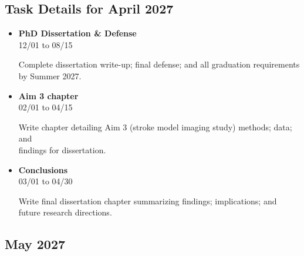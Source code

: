 \documentclass[landscape,a4paper]{article}
\begin{document}
\vspace{0.5cm}
\subsection{Task Details for April 2027}
\begin{itemize}[leftmargin=1cm, itemsep=0.8em]
    \item \textcolor{other}{\textbf{PhD Dissertation \& Defense}}\\[0.2em]
          \textcolor{black!70}{\small 12/01 to 08/15}
\\[0.3em]
          \begin{minipage}[t]{0.85\textwidth}
          \textcolor{black!80}{Complete dissertation write-up; final defense; and all graduation requirements by Summer 2027.}
          \end{minipage}

    \item \textcolor{other}{\textbf{Aim 3 chapter}}\\[0.2em]
          \textcolor{black!70}{\small 02/01 to 04/15}
\\[0.3em]
          \begin{minipage}[t]{0.85\textwidth}
          \textcolor{black!80}{Write chapter detailing Aim 3 (stroke model imaging study) methods; data; and\\[0.1em]
          findings for dissertation.}
          \end{minipage}

    \item \textcolor{other}{\textbf{Conclusions}}\\[0.2em]
          \textcolor{black!70}{\small 03/01 to 04/30}
\\[0.3em]
          \begin{minipage}[t]{0.85\textwidth}
          \textcolor{black!80}{Write final dissertation chapter summarizing findings; implications; and future research directions.}
          \end{minipage}

\end{itemize}

\subsection*{May 2027}
\vspace{0.5cm}
\end{document}

